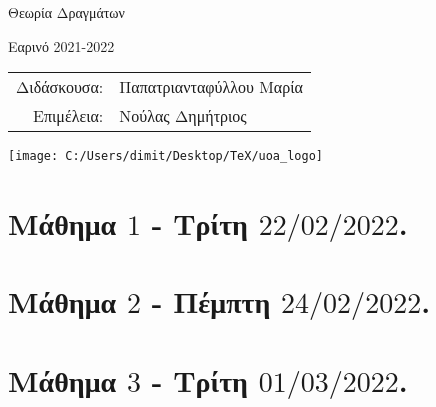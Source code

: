 \documentclass[oneside,a4paper]{article}
\begin{document}
	
	
	\begin{framed}	
		\begin{center}
			\huge Θεωρία Δραγμάτων
		\end{center}
		\begin{center}
			 Εαρινό 2021-2022
		\end{center}
		\vspace{0.3truecm}
		\begin{center}
\begin{tabular}{rl}
    Διδάσκουσα:& Παπατριανταφύλλου Μαρία\\
    Επιμέλεια:& Νούλας Δημήτριος
\end{tabular}
\end{center}
		\vspace{0.3truecm}
	\end{framed}
	\vspace*{\fill}
	\begin{center}
	\texttt{[image: C:/Users/dimit/Desktop/TeX/uoa\_logo]}
	\end{center}
\vspace{1cm}
\pagebreak

\section*{Μάθημα $1$ - Τρίτη $22/02/2022$.}
\vspace{0.3truecm}


\pagebreak


\section*{Μάθημα $2$ - Πέμπτη $24/02/2022$.}
\vspace{0.3truecm}


\pagebreak

\section*{Μάθημα $3$ - Τρίτη $01/03/2022$.}
\vspace{0.3truecm}

\end{document}

